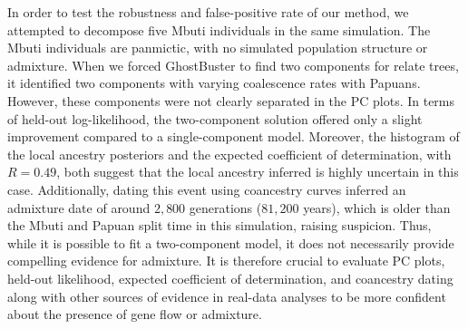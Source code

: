 In order to test the robustness and false-positive rate of our method, we attempted to decompose five Mbuti individuals in the same simulation. The Mbuti individuals are panmictic, with no simulated population structure or admixture. When we forced GhostBuster to find two components for relate trees, it identified two components with varying coalescence rates with Papuans. However, these components were not clearly separated in the PC plots. In terms of held-out log-likelihood, the two-component solution offered only a slight improvement compared to a single-component model. Moreover, the histogram of the local ancestry posteriors and the expected coefficient of determination, with $R = 0.49$, both suggest that the local ancestry inferred is highly uncertain in this case. Additionally, dating this event using coancestry curves inferred an admixture date of around $2{,}800$ generations ($81{,}200$ years), which is older than the Mbuti and Papuan split time in this simulation, raising suspicion. Thus, while it is possible to fit a two-component model, it does not necessarily provide compelling evidence for admixture. It is therefore crucial to evaluate PC plots, held-out likelihood, expected coefficient of determination, and coancestry dating along with other sources of evidence in real-data analyses to be more confident about the presence of gene flow or admixture.

